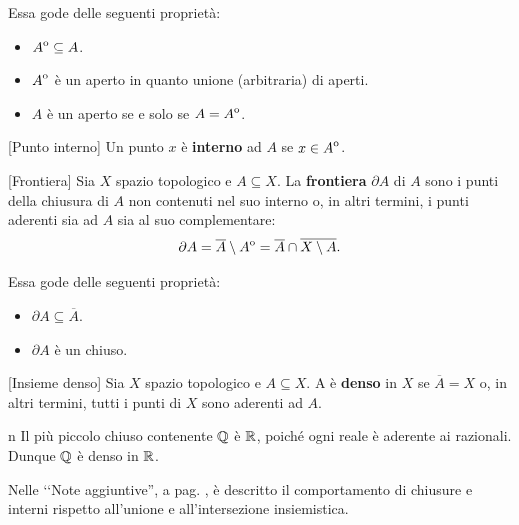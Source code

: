 Essa gode delle seguenti proprietà:
\begin{itemize}
	\item ${\kern0ptA}^{\mathrm{o}}\subseteq A$.
	\item ${\kern0ptA}^{\mathrm{o}}$ è un aperto in quanto unione (arbitraria) di aperti.
	\item $A$ è un aperto se e solo se $ A={\kern0ptA}^{\mathrm{o}}$.
\end{itemize}
\begin{definition}{}[Punto interno]
	Un punto $x$ è \textbf{interno} ad $A$ se $x\in{\kern0ptA}^{\mathrm{o}}$.
\end{definition}
\begin{definition}{}[Frontiera]
Sia $X$ spazio topologico e $A\subseteq X$. La \textbf{frontiera} $\partial A$ di $A$ sono i punti della chiusura di $A$ non contenuti nel suo interno o, in altri termini, i punti aderenti sia ad $A$ sia al suo complementare:
\begin{equation*}
\partial A=\overline{A}\setminus {\kern0ptA}^{\mathrm{o}}=\overline{A}\cap\overline{X\setminus A}.
\end{equation*}
\end{definition}
Essa gode delle seguenti proprietà:
\begin{itemize}
	\item $\partial{A}\subseteq \overline{A}$.
	\item $\partial{A}$ è un chiuso.
\end{itemize}
\begin{definition}{}[Insieme denso]
Sia $X$ spazio topologico e $A\subseteq X$. A è \textbf{denso} in $X$ se $\overline{A}=X$ o, in altri termini, tutti i punti di $X$ sono aderenti ad $A$.
\end{definition}
\begin{example}{n}
Il più piccolo chiuso contenente $\mathbb{Q}$ è $\mathbb{R}$, poiché ogni reale è aderente ai razionali. Dunque $\mathbb{Q}$ è denso in $\mathbb{R}$.
\end{example}
Nelle ‘‘Note aggiuntive'', a pag. \pageref{chiusurainterno}, è descritto il comportamento di chiusure e interni rispetto all'unione e all'intersezione insiemistica.
